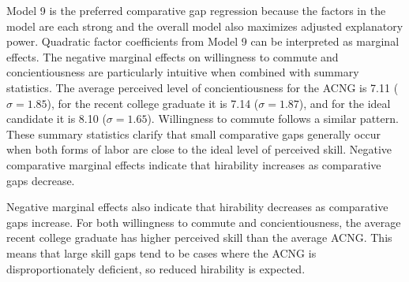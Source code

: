 \documentclass[review]{elsarticle}
\begin{document}
Model 9 is the preferred comparative gap regression because the factors in the model are each strong and the overall model also maximizes adjusted explanatory power.
Quadratic factor coefficients from Model 9 can be interpreted as marginal effects.
The negative marginal effects on willingness to commute and concientiousness are particularly intuitive when combined with summary statistics.
The average perceived level of concientiousness for the ACNG is 7.11 ($\sigma = 1.85$),
for the recent college graduate it is 7.14 ($\sigma = 1.87$),
and for the ideal candidate it is 8.10 ($\sigma = 1.65$).
Willingness to commute follows a similar pattern. %
These summary statistics clarify that small comparative gaps generally occur when both forms of labor are close to the ideal level of perceived skill.
Negative comparative marginal effects indicate that hirability increases as comparative gaps decrease.

Negative marginal effects also indicate that hirability decreases as comparative gaps increase.
For both willingness to commute and concientiousness, the average recent college graduate has higher perceived skill than the average ACNG.
This means that large skill gaps tend to be cases where the ACNG is disproportionately deficient, so reduced hirability is expected.
\end{document}
